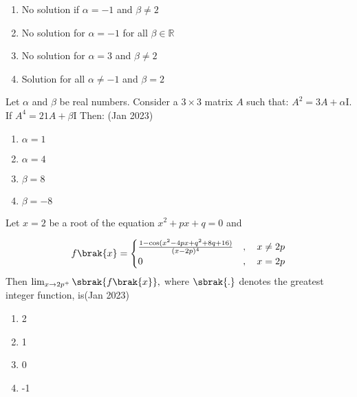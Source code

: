    \begin{enumerate}
       \item No solution if $\alpha = -1$  and $\beta \neq 2$
       \item No solution for $\alpha = -1$ for all $\beta \in \mathbb{R}$
       \item No solution for $\alpha = 3$ and $\beta \neq 2$
       \item Solution for all $\alpha \neq -1$ and $\beta = 2$
   \end{enumerate}

\item Let $\alpha$ and $\beta$ be real numbers. Consider a $ 3 \times 3$ matrix $A$ such that: $A^2 = 3A + \alpha$I. If $A^4 = 21A + \beta$I   Then: \hfill(Jan 2023)
\begin{multicols}{4}
   \begin{enumerate}
       \item $\alpha = 1$
       \item $\alpha = 4$
       \item $\beta = 8$
       \item $\beta = -8$
   \end{enumerate}
\end{multicols}
\item Let \( x = 2 \) be a root of the equation $x^2 + px + q = 0$ and 

\begin{align*}
f\brak{x} = 
\begin{cases} 
\frac{1 - \cos(x^2 - 4px + q^2 + 8q + 16)}{(x - 2p)^4} &, \quad x \neq 2p \\
0 &, \quad x = 2p 
\end{cases}
\end{align*}
Then  $\lim_{x \to 2p^+} \sbrak{f\brak{x}},$ where $\sbrak{.}$ denotes the greatest integer function, is\hfill(Jan 2023)
\begin{multicols}{4}
    \begin{enumerate}
    \item 2 
    \item 1
    \item 0 
    \item -1
\end{enumerate}
\end{multicols}

